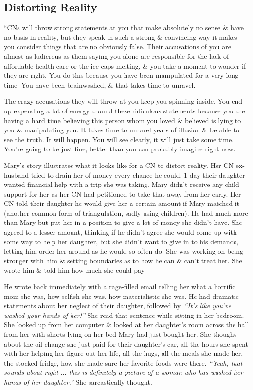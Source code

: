 \documentclass{article}
\numberwithin{equation}{section}
\begin{document}
\subsection{Distorting Reality}
``CNs will throw strong statements at you that make absolutely no sense \& have no basis in reality, but they speak in such a strong \& convincing way it makes you consider things that are no obviously false. Their accusations of you are almost as ludicrous as them saying you alone are responsible for the lack of affordable health care or the ice caps melting, \& you take a moment to wonder if they are right. You do this because you have been manipulated for a very long time. You have been brainwashed, \& that takes time to unravel.

The crazy accusations they will throw at you keep you spinning inside. You end up expending a lot of energy around these ridiculous statements because you are having a hard time believing this person whom you loved \& believed is lying to you \& manipulating you. It takes time to unravel years of illusion \& be able to see the truth. It will happen. You will see clearly, it will just take some time. You're going to be just fine, better than you can probably imagine right now.

Mary's story illustrates what it looks like for a CN to distort reality. Her CN ex-husband tried to drain her of money every chance he could. 1 day their daughter wanted financial help with a trip she was taking. Mary didn't receive any child support for her as her CN had petitioned to take that away from her early. Her CN told their daughter he would give her a certain amount if Mary matched it (another common form of triangulation, sadly using children). He had much more than Mary but put her in a position to give a lot of money she didn't have. She agreed to a lesser amount, thinking if he didn't agree she would come up with some way to help her daughter, but she didn't want to give in to his demands, letting him order her around as he would so often do. She was working on being stronger with him \& setting boundaries as to how he can \& can't treat her. She wrote him \& told him how much she could pay.

He wrote back immediately with a rage-filled email telling her what a horrific mom she was, how selfish she was, how materialistic she was. He had dramatic statements about her neglect of their daughter, followed by, \textit{``It's like you've washed your hands of her!''} She read that sentence while sitting in her bedroom. She looked up from her computer \& looked at her daughter's room across the hall from her with shorts lying on her bed Mary had just bought her. She thought about the oil change she just paid for their daughter's car, all the hours she spent with her helping her figure out her life, all the hugs, all the meals she made her, the stocked fridge, how she made sure her favorite foods were there. \textit{``Yeah, that sounds about right $\ldots$ this is definitely a picture of a woman who has washed her hands of her daughter.''} She sarcastically thought.
\end{document}
